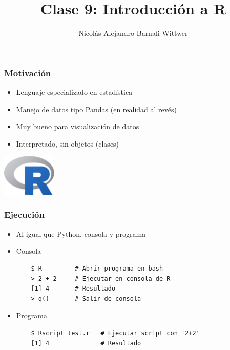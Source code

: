 \documentclass[14pt,aspectratio=169,xcolor=dvipsnames]{beamer}
\title[short title]{Clase 9: Introducción a R}
\subtitle{}
\author[NA Barnafi] {Nicolás Alejandro Barnafi Wittwer}
\institute[UC|CMM] 
{
    Pontificia Universidad Católica de Chile \\
    Centro de Modelamiento Matemático
}
\date{}
\begin{document}
\begin{frame}
    \maketitle
\end{frame}
\begin{frame}\frametitle{Motivación}
    \begin{itemize}
        \item Lenguaje especializado en estadística
        \item Manejo de datos tipo Pandas (en realidad al revés)
        \item Muy bueno para visualización de datos
        \item Interpretado, sin objetos (clases)
    \end{itemize}
    \begin{flushright}
        \includegraphics[height=2cm]{../images/logos/R.png}
    \end{flushright}
\end{frame}
\begin{frame}[fragile]\frametitle{Ejecución}
    \begin{itemize}
        \item Al igual que Python, consola y programa
        \item Consola
            \begin{verbatim}
    $ R         # Abrir programa en bash
    > 2 + 2     # Ejecutar en consola de R
    [1] 4       # Resultado 
    > q()       # Salir de consola
            \end{verbatim}
        \item Programa
            \begin{verbatim}
    $ Rscript test.r   # Ejecutar script con '2+2'
    [1] 4              # Resultado 
            \end{verbatim}

    \end{itemize}
\end{frame}
\end{document}
